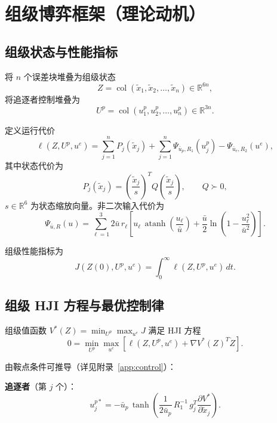 \documentclass[12pt,a4paper]{ctexart}
\DeclareMathOperator{\col}{col}
\DeclareMathOperator{\atanh}{atanh}
\begin{document}
\section{组级博弈框架（理论动机）}

\subsection{组级状态与性能指标}

将 $n$ 个误差块堆叠为组级状态
\[
Z = \col(\tilde{x}_1, \tilde{x}_2, \dots, \tilde{x}_n) \in \mathbb{R}^{6n},
\]
将追逐者控制堆叠为
\[
U^p = \col(u_1^p, u_2^p, \dots, u_n^p) \in \mathbb{R}^{3n}.
\]

定义运行代价
\begin{equation}\label{eq:group-cost}
\ell(Z, U^p, u^e) = \sum_{j=1}^{n} P_j(\tilde{x}_j) + \sum_{j=1}^{n} \Psi_{\bar{u}_p, R_1}(u_j^p) - \Psi_{\bar{u}_e, R_2}(u^e),
\end{equation}
其中状态代价为
\begin{equation}
P_j(\tilde{x}_j) = \left(\frac{\tilde{x}_j}{s}\right)^{\!T} Q \left(\frac{\tilde{x}_j}{s}\right), \qquad Q \succ 0,
\end{equation}
$s \in \mathbb{R}^6$ 为状态缩放向量。非二次输入代价为
\begin{equation}\label{eq:nonquad}
\Psi_{\bar{u}, R}(u) = \sum_{\ell=1}^{3} 2\bar{u}\,r_\ell \left[ u_\ell\,\atanh\!\left(\frac{u_\ell}{\bar{u}}\right) + \frac{\bar{u}}{2} \ln\!\left(1 - \frac{u_\ell^2}{\bar{u}^2}\right) \right].
\end{equation}

组级性能指标为
\[
J(Z(0), U^p, u^e) = \int_0^\infty \ell(Z, U^p, u^e)\,dt.
\]

\subsection{组级 HJI 方程与最优控制律}

组级值函数
$V^*(Z) = \min_{U^p} \max_{u^e} J$
满足 HJI 方程
\begin{equation}\label{eq:group-hji}
0 = \min_{U^p} \max_{u^e} \left[\ell(Z, U^p, u^e) + \nabla V^*(Z)^T \dot{Z}\right].
\end{equation}

由鞍点条件可推导（详见附录~\ref{app:control}）：

\textbf{追逐者}（第 $j$ 个）：
\begin{equation}\label{eq:group-up}
u_j^{p*} = -\bar{u}_p\,\tanh\!\left(\frac{1}{2\bar{u}_p}\,R_1^{-1}\,g_j^T \frac{\partial V^*}{\partial \tilde{x}_j}\right).
\end{equation}
\end{document}

